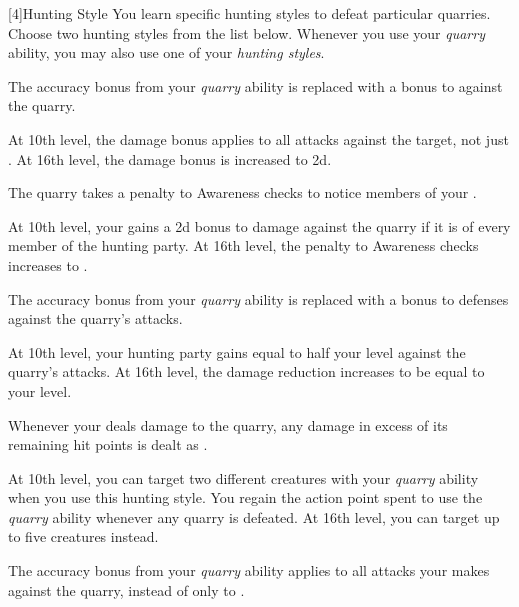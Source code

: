             [4]{Hunting Style}
            You learn specific hunting styles to defeat particular quarries.
            Choose two hunting styles from the list below.
            Whenever you use your \textit{quarry} ability, you may also use one of your \textit{hunting styles}.
            {
                The accuracy bonus from your \textit{quarry} ability is replaced with a  bonus to  against the quarry.

                At 10th level, the damage bonus applies to all attacks against the target, not just .
                At 16th level, the damage bonus is increased to \plus2d.

                The quarry takes a  penalty to Awareness checks to notice members of your .

                At 10th level, your  gains a \plus2d bonus to damage against the quarry if it is \unaware of every member of the hunting party.
                At 16th level, the penalty to Awareness checks increases to .

                The accuracy bonus from your \textit{quarry} ability is replaced with a  bonus to defenses against the quarry's attacks.

                At 10th level, your hunting party gains  equal to half your level against the quarry's attacks.
                At 16th level, the damage reduction increases to be equal to your level.

                Whenever your  deals damage to the quarry, any damage in excess of its remaining hit points is dealt as .

                At 10th level, you can target two different creatures with your \textit{quarry} ability when you use this hunting style.
                You regain the action point spent to use the \textit{quarry} ability whenever any quarry is defeated. 
                At 16th level, you can target up to five creatures instead.

                The accuracy bonus from your \textit{quarry} ability applies to all attacks your  makes against the quarry, instead of only to .

}
